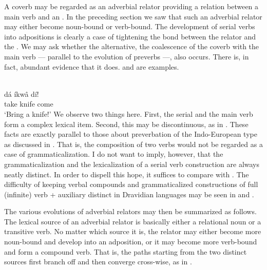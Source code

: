 \noindent A coverb may be regarded as an adverbial relator providing a relation between a main verb and an \np. In the preceding section we saw that such an adverbial relator may either become noun-bound or verb-bound. The development of serial verbs into adpositions is clearly a case of tightening the bond between the relator and the \np. We may ask whether the alternative, the coalescence of the coverb with the main verb — parallel to the evolution of preverbs —, also occurs. There is, in fact, abundant evidence that it does.  and  are examples.

\ea\label{ex:E90}
\\
\gll dá  íkwâ  dí!  \\
 take  knife  come  \\
 \glt ‘Bring a knife!’   
\z
{}
\noindent We observe two things here. First, the serial and the main verb form a complex lexical item. Second, this may be discontinuous, as in . These facts are exactly parallel to those about preverbation of the Indo-European type as discussed in . That is, the composition of two verbs would not be regarded as a case of grammaticalization. I do not want to imply, however, that the grammaticalization and the lexicalization of a serial verb construction are always neatly distinct. In order to dispell this hope, it suffices to compare  with . The difficulty of keeping verbal compounds and grammaticalized constructions of full (infinite) verb + auxiliary distinct in Dravidian languages may be seen in \citet[90--96, 109--112]{Bloch1954} and \citet{Kachru1980}.

The various evolutions of adverbial relators may then be summarized as follows. The lexical source of an adverbial relator is basically either a relational noun or a transitive verb. No matter which source it is, the relator may either become more noun-bound and develop into an adposition, or it may become more verb-bound and form a compound verb. That is, the paths starting from the two distinct sources first branch off and then converge cross-wise, as in .

